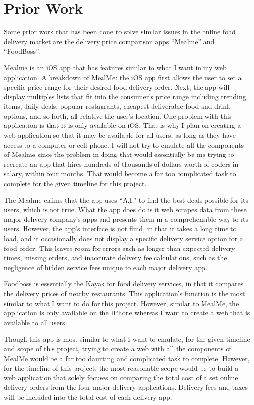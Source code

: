\documentclass[10pt,twocolumn]{article}
\begin{document}
\section{Prior Work}

Some prior work that has been done to solve similar issues in the online food delivery market are the delivery price comparison apps “Mealme”  and “FoodBoss”.

Mealme is an iOS app that has features similar to what I want in my web application. A breakdown of MealMe: the iOS app first allows the user to set a specific price range for their desired food delivery order. Next, the app will display multiples lists that fit into the consumer's price range including trending items, daily deals, popular restaurants, cheapest deliverable food and drink options, and so forth, all relative the user's location. One problem with this application is that it is only available on iOS. That is why I plan on creating a web application so that it may be available for all users, as long as they have access to a computer or cell phone. I will not try to emulate all the components of Mealme since the problem in doing that would essentially be me trying to recreate an app that hires hundreds of thousands of dollars worth of coders in salary, within four months. That would become a far too complicated task to complete for the given timeline for this project.

The Mealme claims that the app uses “A.I.” to find the best deals possible for its users, which is not true. What the app does do is it web scrapes data from these major delivery company's apps and presents them in a comprehensible way to its users. However, the app’s interface is not fluid, in that it takes a long time to load, and it occasionally does not display a specific delivery service option for a food order. This leaves room for errors such as longer than expected delivery times, missing orders, and inaccurate delivery fee calculations, such as the negligence of hidden service fees unique to each major delivery app.

Foodboss is essentially the Kayak for food delivery services, in that it compares the delivery prices of nearby restaurants. This application's function is the most similar to what I want to do for this project. However, similar to MealMe, the application is only available on the IPhone whereas I want to create a web that is available to all users.

Though this app is most similar to what I want to emulate, for the given timeline and scope of this project, trying to create a web with all the components of MealMe would be a far too daunting and complicated task to complete. However, for the timeline of this project, the most reasonable scope would be to build a web application that solely focuses on comparing the total cost of a set online delivery orders from the four major delivery applications. Delivery fees and taxes will be included into the total cost of each delivery app.
\end{document}
